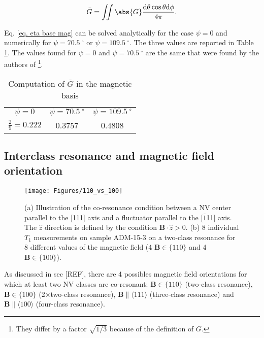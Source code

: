 \documentclass[a4paper,11pt]{report}
\begin{document}
\begin{equation}
\label{eq. eta base mag}
\bar{G}= \iint \abs{G} \frac{\rm d\theta \cos \theta \rm d\phi}{4 \pi}.
\end{equation}

Eq. \ref{eq. eta base mag} can be solved analytically for the case $\psi=0$ and numerically for $\psi=70.5 \ ^\circ$ or $\psi=109.5 \ ^\circ$. The three values are reported in Table \ref{table G mag}. The values found for $\psi=0$ and $\psi=70.5 \ ^\circ$ are the same that were found by the authors of \citep{choi2017depolarization} \footnote{They differ by a factor $\sqrt{1/3}$ because of the definition of $G$.}.

\begin{table}[htbp]
\centering
\caption{Computation of $\bar G$ in the magnetic basis}
 \label{table G mag}
\begin{tabular}{c|c|c}
\toprule
$\psi=0$ & $\psi=70.5 \ ^\circ$ & $\psi=109.5 \ ^\circ$ \\

$\frac{2}{9}=0.222$ & 0.3757 & 0.4808 \\
\bottomrule
\end{tabular}
\end{table}

\subsection{Interclass resonance and magnetic field orientation}

\begin{figure}[h]
\centering
\texttt{[image: Figures/110\_vs\_100]}
\caption{(a) Illustration of the co-resonance condition between a NV center parallel to the [111] axis and a fluctuator parallel to the [$\bar 1$11] axis. The $\hat z$ direction is defined by the condition $\mathbf{B}\cdot\hat{z} >0$. (b) 8 individual $T_1$ measurements on sample ADM-15-3 on a two-class resonance for 8 different values of the magnetic field (4 $\mathbf{B} \in \{110\}$ and 4 $\mathbf{B} \in \{100\}$).}
\label{110 vs 100 annexe}
\end{figure}

As discussed in sec [REF], there are 4 possibles magnetic field orientations for which at least two NV classes are co-resonant: $\mathbf{B} \in \{110\}$ (two-class resonance), $\mathbf{B} \in \{100\}$ (2$\times$two-class resonance), $\mathbf{B} \parallel \langle 111 \rangle$ (three-class resonance) and $\mathbf{B} \parallel \langle 100\rangle$ (four-class resonance).
\end{document}
